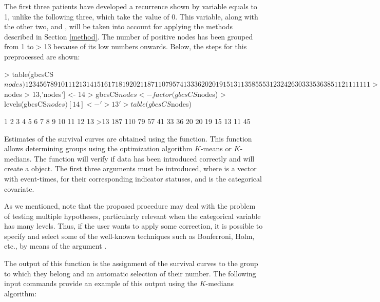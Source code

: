 The first three patients have developed a recurrence shown by  variable equals to 1,  unlike the following three, which take the value of 0. This  variable, along with the other two,  and , will be taken into account for  applying the methods described in Section \ref{method}. The number of positive nodes has been grouped from 1 to > 13 because of its low numbers onwards.  
Below, the steps for this preprocessed are shown:
\begin{example}
> table(gbcsCS$nodes)

  1   2   3   4   5   6   7   8   9  10  11  12  13  14  15  16  17  18  19  20  21 
187 110  79  57  41  33  36  20  20  19  15  13  11   3   5   8   5   5   5   3   1 
 23  24  26  30  33  35  36  38  51 
  1   2   1   1   1   1   1   1   1 

> gbcsCS[gbcsCS$nodes > 13,'nodes'] <- 14
> gbcsCS$nodes <- factor(gbcsCS$nodes)
> levels(gbcsCS$nodes)[14]<- '>13'
> table(gbcsCS$nodes)

  1   2   3   4   5   6   7   8   9  10  11  12  13 >13 
187 110  79  57  41  33  36  20  20  19  15  13  11  45 
\end{example}


Estimates of the survival curves are obtained using the   function.  This function allows determining  groups using the optimization algorithm $K$-means or $K$-medians.  The function will verify if data has been introduced correctly and will create a  object. The first three arguments  must be  introduced, where  is a vector with event-times,  for their corresponding indicator statuses, and   is the categorical covariate.  

As we mentioned, note that the proposed  procedure may deal with the problem of testing multiple hypotheses, particularly relevant when the categorical variable has many levels. Thus, if the user wants to apply some correction, it is possible to specify  and select some of the well-known techniques such as Bonferroni, Holm, etc., by means of the argument .  

The output of this function is  the assignment of the survival curves to the group to which they belong and an automatic selection of their number.  The following input commands provide an example of this output using the $K$-medians algorithm:

